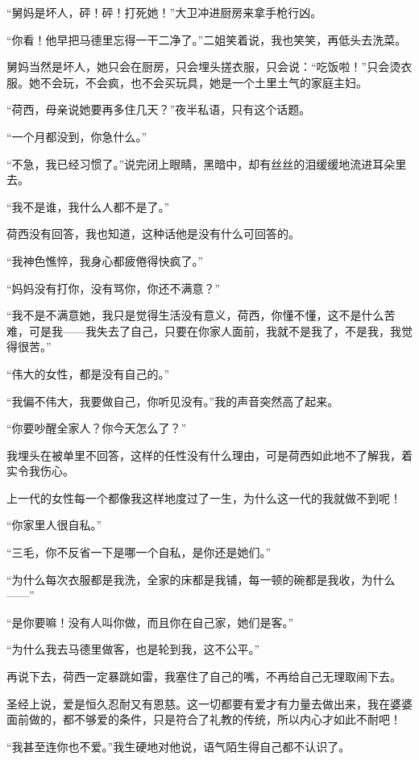 \par “舅妈是坏人，砰！砰！打死她！”大卫冲进厨房来拿手枪行凶。
\par “你看！他早把马德里忘得一干二净了。”二姐笑着说，我也笑笑，再低头去洗菜。
\par 舅妈当然是坏人，她只会在厨房，只会埋头搓衣服，只会说：“吃饭啦！”只会烫衣服。她不会玩，不会疯，也不会买玩具，她是一个土里土气的家庭主妇。
\par “荷西，母亲说她要再多住几天？”夜半私语，只有这个话题。
\par “一个月都没到，你急什么。”
\par “不急，我已经习惯了。”说完闭上眼睛，黑暗中，却有丝丝的泪缓缓地流进耳朵里去。
\par “我不是谁，我什么人都不是了。”
\par 荷西没有回答，我也知道，这种话他是没有什么可回答的。
\par “我神色憔悴，我身心都疲倦得快疯了。”
\par “妈妈没有打你，没有骂你，你还不满意？”
\par “我不是不满意她，我只是觉得生活没有意义，荷西，你懂不懂，这不是什么苦难，可是我——我失去了自己，只要在你家人面前，我就不是我了，不是我，我觉得很苦。”
\par “伟大的女性，都是没有自己的。”
\par “我偏不伟大，我要做自己，你听见没有。”我的声音突然高了起来。
\par “你要吵醒全家人？你今天怎么了？”
\par 我埋头在被单里不回答，这样的任性没有什么理由，可是荷西如此地不了解我，着实令我伤心。
\par 上一代的女性每一个都像我这样地度过了一生，为什么这一代的我就做不到呢！
\par “你家里人很自私。”
\par “三毛，你不反省一下是哪一个自私，是你还是她们。”
\par “为什么每次衣服都是我洗，全家的床都是我铺，每一顿的碗都是我收，为什么——”
\par “是你要嘛！没有人叫你做，而且你在自己家，她们是客。”
\par “为什么我去马德里做客，也是轮到我，这不公平。”
\par 再说下去，荷西一定暴跳如雷，我塞住了自己的嘴，不再给自己无理取闹下去。
\par 圣经上说，爱是恒久忍耐又有恩慈。这一切都要有爱才有力量去做出来，我在婆婆面前做的，都不够爱的条件，只是符合了礼教的传统，所以内心才如此不耐吧！
\par “我甚至连你也不爱。”我生硬地对他说，语气陌生得自己都不认识了。
